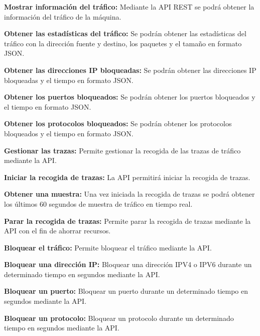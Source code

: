 \begin{functional}
        \setcounter{enumi}{18}
        \item \textbf{Mostrar información del tráfico:} Mediante la API REST se podrá obtener la información del tráfico de la máquina.
        \begin{functional}
            \item \textbf{Obtener las estadísticas del tráfico:} Se podrán obtener las estadísticas del tráfico con la dirección fuente y destino, los paquetes y el tamaño en formato JSON.
            \item \textbf{Obtener las direcciones IP bloqueadas:} Se podrán obtener las direcciones IP bloqueadas y el tiempo en formato JSON.
            \item \textbf{Obtener los puertos bloqueados:} Se podrán obtener los puertos bloqueados y el tiempo en formato JSON.
            \item \textbf{Obtener los protocolos bloqueados:} Se podrán obtener los protocolos bloqueados y el tiempo en formato JSON.
        \end{functional}

        \item \textbf{Gestionar las trazas:} Permite gestionar la recogida de las trazas de tráfico mediante la API.
        \begin{functional}
            \item \textbf{Iniciar la recogida de trazas:} La API permitirá iniciar la recogida de trazas.
            \item \textbf{Obtener una muestra:} Una vez iniciada la recogida de trazas se podrá obtener los últimos 60 segundos de muestra de tráfico en tiempo real. 
            \item \textbf{Parar la recogida de trazas:} Permite parar la recogida de trazas mediante la API con el fin de ahorrar recursos.
        \end{functional}
        
        \item \textbf{Bloquear el tráfico:} Permite bloquear el tráfico mediante la API.
        \begin{functional}
            \item \textbf{Bloquear una dirección IP:} Bloquear una dirección IPV4 o IPV6 durante un determinado tiempo en segundos mediante la API.
            \item \textbf{Bloquear un puerto:} Bloquear un puerto durante un determinado tiempo en segundos mediante la API.
            \item \textbf{Bloquear un protocolo:} Bloquear un protocolo durante un determinado tiempo en segundos mediante la API.
        \end{functional}
        

\end{functional}
